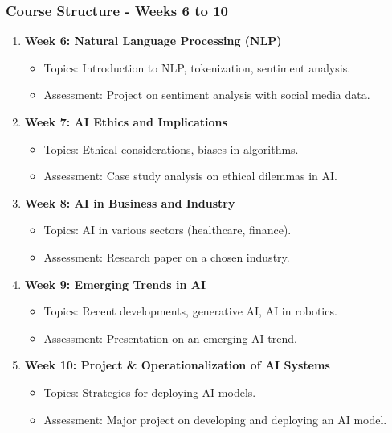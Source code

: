 \documentclass[aspectratio=169]{beamer}
\begin{document}
\begin{frame}[fragile]
    \frametitle{Course Structure - Weeks 6 to 10}
    \begin{enumerate}\addtocounter{enumi}{5}
        \item \textbf{Week 6: Natural Language Processing (NLP)}
            \begin{itemize}
                \item Topics: Introduction to NLP, tokenization, sentiment analysis.
                \item Assessment: Project on sentiment analysis with social media data.
            \end{itemize}
        \item \textbf{Week 7: AI Ethics and Implications}
            \begin{itemize}
                \item Topics: Ethical considerations, biases in algorithms.
                \item Assessment: Case study analysis on ethical dilemmas in AI.
            \end{itemize}
        \item \textbf{Week 8: AI in Business and Industry}
            \begin{itemize}
                \item Topics: AI in various sectors (healthcare, finance).
                \item Assessment: Research paper on a chosen industry.
            \end{itemize}
        \item \textbf{Week 9: Emerging Trends in AI}
            \begin{itemize}
                \item Topics: Recent developments, generative AI, AI in robotics.
                \item Assessment: Presentation on an emerging AI trend.
            \end{itemize}
        \item \textbf{Week 10: Project \& Operationalization of AI Systems}
            \begin{itemize}
                \item Topics: Strategies for deploying AI models.
                \item Assessment: Major project on developing and deploying an AI model.
            \end{itemize}
    \end{enumerate}
\end{frame}
\end{document}
